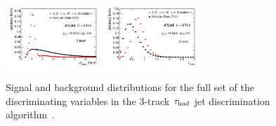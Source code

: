 \begin{figure}[tp]
  \includegraphics[width=0.32\textwidth]{figures/PERF-2013-06/figaux_12}
  \includegraphics[width=0.32\textwidth]{figures/PERF-2013-06/figaux_13}
  \caption{Signal and background distributions for the full set of the discriminating variables in the 3-track $\tau_\text{had}$ jet discrimination algorithm~\cite{PERF-2013-06}.}
  \label{fig:tauid-inputs-3p}
\end{figure}

\clearpage


